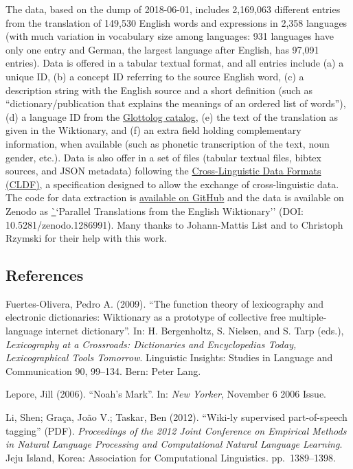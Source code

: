 \documentclass[
  a4paper,
  14pt,
  oneside,
  tablecaptionabove
]{scrbook}
\begin{document}
The data, based on the dump of 2018-06-01, includes 2,169,063 different
entries from the translation of 149,530 English words and expressions in
2,358 languages (with much variation in vocabulary size among languages:
931 languages have only one entry and German, the largest language after
English, has 97,091 entries). Data is offered in a tabular textual
format, and all entries include (a) a unique ID, (b) a concept ID
referring to the source English word, (c) a description string with the
English source and a short definition (such as ``dictionary/publication
that explains the meanings of an ordered list of words''), (d)
a language ID from the \href{http://glottolog.org}{Glottolog catalog},
(e) the text of the translation as given in the Wiktionary, and (f) an
extra field holding complementary information, when available (such as
phonetic transcription of the text, noun gender, etc.). Data is also
offer in a set of files (tabular textual files, bibtex sources, and JSON
metadata) following the \href{http://cldf.clld.org}{Cross-Linguistic
Data Formats (CLDF)}, a specification designed to allow the exchange of
cross-linguistic data. The code for data extraction is
\href{https://github.com/tresoldi/wiktionary_parser}{available on
GitHub} and the data is available on Zenodo as
\href{https://zenodo.org/record/1286991}``Parallel Translations from the
English Wiktionary'' (DOI: 10.5281/zenodo.1286991). Many thanks to
Johann-Mattis List and to Christoph Rzymski for their help with this
work.

\subsection*{References}

\nopagebreak\hangindent=0.7cm {\small Fuertes-Olivera, Pedro A. (2009). \enquote{The function theory of
lexicography and electronic dictionaries: Wiktionary as a prototype of
collective free multiple-language internet dictionary}. In: H.
Bergenholtz, S. Nielsen, and S. Tarp (eds.), \emph{Lexicography at a
Crossroads: Dictionaries and Encyclopedias Today, Lexicographical Tools
Tomorrow}.  Linguistic Insights: Studies in Language and Communication
90, 99--134. Bern: Peter Lang. }

\nopagebreak\hangindent=0.7cm {\small Lepore, Jill (2006). \enquote{Noah's Mark}. In: \emph{New Yorker},
November 6 2006 Issue. }

\nopagebreak\hangindent=0.7cm {\small Li, Shen; Graça, João V.; Taskar, Ben (2012). \enquote{Wiki-ly
supervised part-of-speech tagging} (PDF). \emph{Proceedings of the 2012
Joint Conference on Empirical Methods in Natural Language Processing and
Computational Natural Language Learning}.  Jeju Island, Korea:
Association for Computational Linguistics. pp.~1389--1398. }
\end{document}
